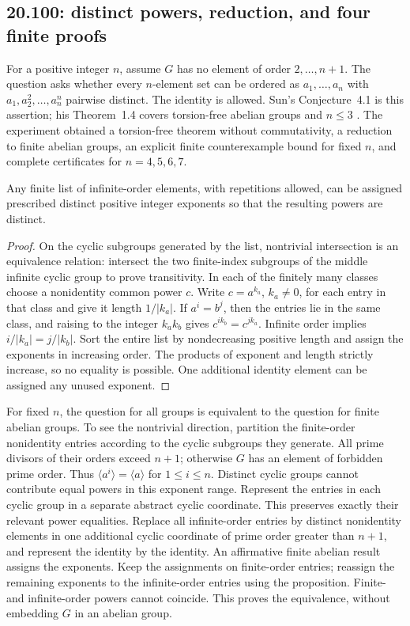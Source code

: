 \subsection{20.100: distinct powers, reduction, and four finite proofs}
\label{partial:20.100}

For a positive integer \(n\), assume \(G\) has no element of order
\(2,\ldots,n+1\). The question asks whether every \(n\)-element set
can be ordered as \(a_1,\ldots,a_n\) with
\(a_1,a_2^2,\ldots,a_n^n\) pairwise distinct. The identity is allowed.
Sun's Conjecture~4.1 is this assertion; his Theorem~1.4 covers
torsion-free abelian groups and \(n\le3\) \cite{sun-permutations}.
The experiment obtained a torsion-free theorem without commutativity,
a reduction to finite abelian groups, an explicit finite
counterexample bound for fixed \(n\), and complete certificates
for \(n=4,5,6,7\).

\begin{proposition}
Any finite list of infinite-order elements, with repetitions allowed,
can be assigned prescribed distinct positive integer exponents so
that the resulting powers are distinct.
\end{proposition}
\begin{proof}
On the cyclic subgroups generated by the list, nontrivial
intersection is an equivalence relation: intersect the two
finite-index subgroups of the middle infinite cyclic group to
prove transitivity. In each of the finitely many classes choose
a nonidentity common power \(c\). Write \(c=a^{k_a}\), \(k_a\ne0\),
for each entry in that class and give it length \(1/|k_a|\).
If \(a^i=b^j\), then the entries lie in the same class, and raising
to the integer \(k_ak_b\) gives \(c^{ik_b}=c^{jk_a}\).
Infinite order implies \(i/|k_a|=j/|k_b|\).
Sort the entire list by nondecreasing positive length and assign
the exponents in increasing order. The products of exponent and
length strictly increase, so no equality is possible.
One additional identity element can be assigned any unused exponent.
\end{proof}

For fixed \(n\), the question for all groups is equivalent to the
question for finite abelian groups. To see the nontrivial direction,
partition the finite-order nonidentity entries according to the
cyclic subgroups they generate. All prime divisors of their orders
exceed \(n+1\); otherwise \(G\) has an element of forbidden prime
order. Thus \(\langle a^i\rangle=\langle a\rangle\) for
\(1\le i\le n\). Distinct cyclic groups cannot contribute equal
powers in this exponent range.
Represent the entries in each cyclic group in a separate abstract
cyclic coordinate. This preserves exactly their relevant power
equalities. Replace all infinite-order entries by distinct
nonidentity elements in one additional cyclic coordinate of prime
order greater than \(n+1\), and represent the identity by the identity.
An affirmative finite abelian result assigns the exponents.
Keep the assignments on finite-order entries; reassign the
remaining exponents to the infinite-order entries using the
proposition. Finite- and infinite-order powers cannot coincide.
This proves the equivalence, without embedding \(G\) in an abelian
group.

